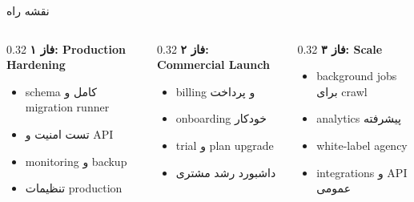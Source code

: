 \documentclass[aspectratio=169,12pt]{beamer}
\begin{document}
\begin{frame}{نقشه راه}
  \begin{columns}[T,totalwidth=\textwidth]
    \begin{column}{0.32\textwidth}
      \textbf{فاز ۱: Production Hardening}
      \begin{itemize}
        \item schema کامل و migration runner
        \item تست امنیت و API
        \item monitoring و backup
        \item تنظیمات production
      \end{itemize}
    \end{column}
    \begin{column}{0.32\textwidth}
      \textbf{فاز ۲: Commercial Launch}
      \begin{itemize}
        \item billing و پرداخت
        \item onboarding خودکار
        \item trial و plan upgrade
        \item داشبورد رشد مشتری
      \end{itemize}
    \end{column}
    \begin{column}{0.32\textwidth}
      \textbf{فاز ۳: Scale}
      \begin{itemize}
        \item background jobs برای crawl
        \item analytics پیشرفته
        \item white-label agency
        \item integrations و API عمومی
      \end{itemize}
    \end{column}
  \end{columns}
\end{frame}
\end{document}
